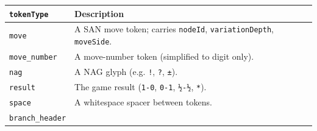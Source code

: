 \documentclass[]{article}
\begin{document}
\begin{longtable}[]{@{}ll@{}}
\toprule
\begin{minipage}[b]{0.05\columnwidth}\raggedright\strut
\texttt{tokenType}\strut
\end{minipage} & \begin{minipage}[b]{0.05\columnwidth}\raggedright\strut
Description\strut
\end{minipage}\tabularnewline
\midrule
\endhead
\begin{minipage}[t]{0.05\columnwidth}\raggedright\strut
\texttt{move}\strut
\end{minipage} & \begin{minipage}[t]{0.05\columnwidth}\raggedright\strut
A SAN move token; carries \texttt{nodeId}, \texttt{variationDepth},
\texttt{moveSide}.\strut
\end{minipage}\tabularnewline
\begin{minipage}[t]{0.05\columnwidth}\raggedright\strut
\texttt{move\_number}\strut
\end{minipage} & \begin{minipage}[t]{0.05\columnwidth}\raggedright\strut
A move-number token (simplified to digit only).\strut
\end{minipage}\tabularnewline
\begin{minipage}[t]{0.05\columnwidth}\raggedright\strut
\texttt{nag}\strut
\end{minipage} & \begin{minipage}[t]{0.05\columnwidth}\raggedright\strut
A NAG glyph (e.g. \texttt{!}, \texttt{?}, \texttt{±}).\strut
\end{minipage}\tabularnewline
\begin{minipage}[t]{0.05\columnwidth}\raggedright\strut
\texttt{result}\strut
\end{minipage} & \begin{minipage}[t]{0.05\columnwidth}\raggedright\strut
The game result (\texttt{1-0}, \texttt{0-1}, \texttt{½-½},
\texttt{*}).\strut
\end{minipage}\tabularnewline
\begin{minipage}[t]{0.05\columnwidth}\raggedright\strut
\texttt{space}\strut
\end{minipage} & \begin{minipage}[t]{0.05\columnwidth}\raggedright\strut
A whitespace spacer between tokens.\strut
\end{minipage}\tabularnewline
\begin{minipage}[t]{0.05\columnwidth}\raggedright\strut
\texttt{branch\_header}\strut

\end{minipage}
\end{longtable}
\end{document}
